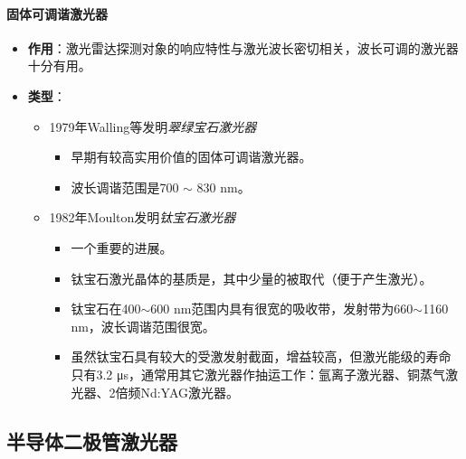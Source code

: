 \paragraph{固体可调谐激光器} 
\begin{itemize}
	\item \textbf{作用}：激光雷达探测对象的响应特性与激光波长密切相关，波长可调的激光器十分有用。
	\item \textbf{类型}：
		\begin{itemize}
			\item 1979年Walling等发明\textit{翠绿宝石激光器}
				\begin{itemize}
					\item 早期有较高实用价值的固体可调谐激光器。
					\item 波长调谐范围是700 $ \sim $ 830 nm。
				\end{itemize} %
			\item 1982年Moulton发明\textit{钛宝石激光器}
				\begin{itemize}
					\item 一个重要的进展。
					\item 钛宝石激光晶体的基质是，其中少量的被取代（便于产生激光）。
					\item 钛宝石在400$ \sim $600 nm范围内具有很宽的吸收带，发射带为660$ \sim $1160 nm，波长调谐范围很宽。
					\item 虽然钛宝石具有较大的受激发射截面，增益较高，但激光能级的寿命只有3.2 μs，通常用其它激光器作抽运工作：氩离子激光器、铜蒸气激光器、2倍频Nd:YAG激光器。
				\end{itemize}
		\end{itemize} %
\end{itemize} %

\subsection{半导体二极管激光器} %
